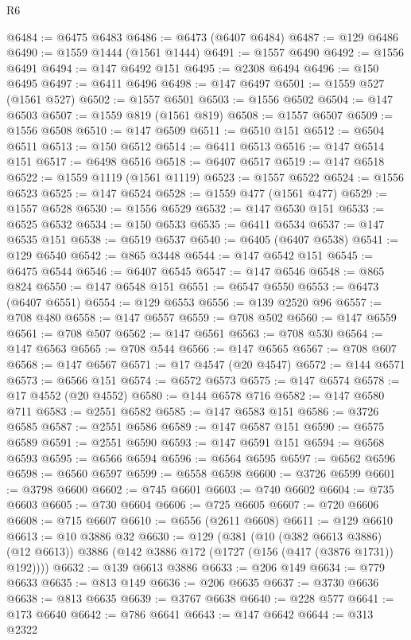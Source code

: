\begin{lexlean}{R6}
\begin{coremodule}
@6484 := @6475 @6483
@6486 := @6473 (@6407 @6484)
@6487 := @129 @6486
@6490 := @1559 @1444 (@1561 @1444)
@6491 := @1557 @6490
@6492 := @1556 @6491
@6494 := @147 @6492 @151
@6495 := @2308 @6494
@6496 := @150 @6495
@6497 := @6411 @6496
@6498 := @147 @6497
@6501 := @1559 @527 (@1561 @527)
@6502 := @1557 @6501
@6503 := @1556 @6502
@6504 := @147 @6503
@6507 := @1559 @819 (@1561 @819)
@6508 := @1557 @6507
@6509 := @1556 @6508
@6510 := @147 @6509
@6511 := @6510 @151
@6512 := @6504 @6511
@6513 := @150 @6512
@6514 := @6411 @6513
@6516 := @147 @6514 @151
@6517 := @6498 @6516
@6518 := @6407 @6517
@6519 := @147 @6518
@6522 := @1559 @1119 (@1561 @1119)
@6523 := @1557 @6522
@6524 := @1556 @6523
@6525 := @147 @6524
@6528 := @1559 @477 (@1561 @477)
@6529 := @1557 @6528
@6530 := @1556 @6529
@6532 := @147 @6530 @151
@6533 := @6525 @6532
@6534 := @150 @6533
@6535 := @6411 @6534
@6537 := @147 @6535 @151
@6538 := @6519 @6537
@6540 := @6405 (@6407 @6538)
@6541 := @129 @6540
@6542 := @865 @3448
@6544 := @147 @6542 @151
@6545 := @6475 @6544
@6546 := @6407 @6545
@6547 := @147 @6546
@6548 := @865 @824
@6550 := @147 @6548 @151
@6551 := @6547 @6550
@6553 := @6473 (@6407 @6551)
@6554 := @129 @6553
@6556 := @139 @2520 @96
@6557 := @708 @480
@6558 := @147 @6557
@6559 := @708 @502
@6560 := @147 @6559
@6561 := @708 @507
@6562 := @147 @6561
@6563 := @708 @530
@6564 := @147 @6563
@6565 := @708 @544
@6566 := @147 @6565
@6567 := @708 @607
@6568 := @147 @6567
@6571 := @17 @4547 (@20 @4547)
@6572 := @144 @6571
@6573 := @6566 @151
@6574 := @6572 @6573
@6575 := @147 @6574
@6578 := @17 @4552 (@20 @4552)
@6580 := @144 @6578 @716
@6582 := @147 @6580 @711
@6583 := @2551 @6582
@6585 := @147 @6583 @151
@6586 := @3726 @6585
@6587 := @2551 @6586
@6589 := @147 @6587 @151
@6590 := @6575 @6589
@6591 := @2551 @6590
@6593 := @147 @6591 @151
@6594 := @6568 @6593
@6595 := @6566 @6594
@6596 := @6564 @6595
@6597 := @6562 @6596
@6598 := @6560 @6597
@6599 := @6558 @6598
@6600 := @3726 @6599
@6601 := @3798 @6600
@6602 := @745 @6601
@6603 := @740 @6602
@6604 := @735 @6603
@6605 := @730 @6604
@6606 := @725 @6605
@6607 := @720 @6606
@6608 := @715 @6607
@6610 := @6556 (@2611 @6608)
@6611 := @129 @6610
@6613 := @10 @3886 @32
@6630 := @129
    (@381
      (@10 (@382 @6613 @3886) (@12 @6613))
      @3886
      (@142 @3886 @172 (@1727 (@156 (@417 (@3876 @1731)) @192))))
@6632 := @139 @6613 @3886
@6633 := @206 @149
@6634 := @779 @6633
@6635 := @813 @149
@6636 := @206 @6635
@6637 := @3730 @6636
@6638 := @813 @6635
@6639 := @3767 @6638
@6640 := @228 @577
@6641 := @173 @6640
@6642 := @786 @6641
@6643 := @147 @6642
@6644 := @313 @2322

\end{coremodule}
\end{lexlean}

